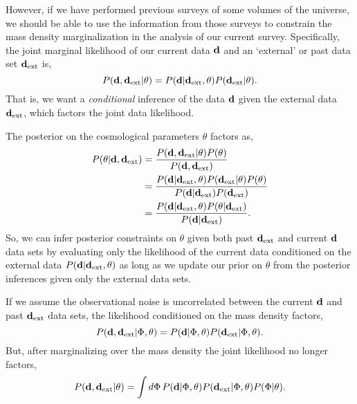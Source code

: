 \documentclass[11pt, letterpaper]{article}
\begin{document}
However, if we have performed previous surveys of some volumes of the universe, we should be
able to use the information from those surveys to constrain the mass density marginalization in
the analysis of our current survey.
Specifically, the joint marginal likelihood of our current data $\mathbf{d}$ and an `external' or
past data set $\mathbf{d}_{\rm ext}$ is,
\begin{equation}\label{eq:joint_likelihood}
	P(\mathbf{d}, \mathbf{d}_{\rm ext} | \theta) =
	P(\mathbf{d} | \mathbf{d}_{\rm ext}, \theta) P(\mathbf{d}_{\rm ext} | \theta).
\end{equation}
That is, we want a \emph{conditional} inference of the data $\mathbf{d}$ given the external data $\mathbf{d}_{\rm ext}$,
which factors the joint data likelihood.

The posterior on the cosmological parameters $\theta$ factors as,
\begin{align}
	P(\theta | \mathbf{d}, \mathbf{d}_{\rm ext}) &= \frac{P(\mathbf{d}, \mathbf{d}_{\rm ext} | \theta) P(\theta)}{P(\mathbf{d},\mathbf{d}_{\rm ext})}
	\notag\\
	&= \frac{P(\mathbf{d} | \mathbf{d}_{\rm ext},\theta) P(\mathbf{d}_{\rm ext} | \theta) P(\theta)}{P(\mathbf{d} | \mathbf{d}_{\rm ext}) P(\mathbf{d}_{\rm ext})}
	\notag\\
	&= \frac{P(\mathbf{d} | \mathbf{d}_{\rm ext},\theta) P(\theta | \mathbf{d}_{\rm ext})}{P(\mathbf{d} | \mathbf{d}_{\rm ext})}.
	\label{eq:factored_posterior}
\end{align}
So, we can infer posterior constraints on $\theta$ given both past $\mathbf{d}_{\rm ext}$ and current $\mathbf{d}$ data sets
by evaluating only the likelihood of the current data conditioned on the external data $P(\mathbf{d}|\mathbf{d}_{\rm ext},\theta)$
as long as we update our prior on $\theta$ from the posterior inferences given only the external data sets.

If we assume the observational noise is uncorrelated between the current $\mathbf{d}$ and past $\mathbf{d}_{\rm ext}$ data sets,
the likelihood conditioned on the mass density factors,
\begin{equation}
	P(\mathbf{d},\mathbf{d}_{\rm ext} | \Phi, \theta) = P(\mathbf{d} | \Phi, \theta) P(\mathbf{d}_{\rm ext} | \Phi, \theta).
\end{equation}
But, after marginalizing over the mass density the joint likelihood no longer factors,
\begin{equation}\label{eq:marg_likelihood}
	P(\mathbf{d}, \mathbf{d}_{\rm ext} | \theta) =
	\int d\Phi\, P(\mathbf{d} | \Phi, \theta) P(\mathbf{d}_{\rm ext} | \Phi, \theta) P(\Phi | \theta).
\end{equation}
\end{document}
